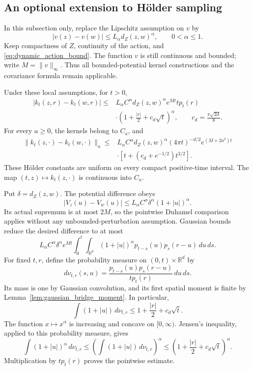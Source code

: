 \subsection{An optional extension to H\"older sampling}
In this subsection only, replace the Lipschitz assumption on $v$ by
\[
|v(z)-v(w)|\leq L_\alpha d_Z(z,w)^\alpha,
\qquad 0<\alpha\leq1.
\]
Keep compactness of $Z$, continuity of the action, and
\eqref{eq:dynamic_action_bound}. The function $v$ is still continuous
and bounded; write $M=\|v\|_\infty$. Thus all bounded-potential kernel
constructions and the covariance formula remain applicable.

\begin{theorem}
\label{thm:dynamic_kernel_holder}
Under these local assumptions, for $t>0$,
\[
\begin{split}
|k_t(z,r)-k_t(w,r)|\leq{}&
 L_\alpha C^\alpha d_Z(z,w)^\alpha e^{Mt}t p_t(r)\\
&\cdot\left(1+\frac{|r|}{2}+c_d\sqrt t\right)^\alpha,
\qquad c_d=\frac{\pi\sqrt{2d}}8.
\end{split}
\]
For every $a\geq0$, the kernels belong to $C_a$, and
\[
\begin{split}
\|k_t(z,\cdot)-k_t(w,\cdot)\|_a
\leq{}&L_\alpha C^\alpha d_Z(z,w)^\alpha
       (4\pi t)^{-d/2}e^{(M+2a^2)t}\\
&\cdot\left[t+(c_d+e^{-1/2})t^{3/2}\right].
\end{split}
\]
These H\"older constants are uniform on every compact positive-time
interval. The map $(t,z)\mapsto k_t(z,\cdot)$ is continuous into $C_a$.
\end{theorem}
\Proof
Put $\delta=d_Z(z,w)$. The potential difference obeys
\[
|V_z(u)-V_w(u)|
\leq L_\alpha C^\alpha\delta^\alpha(1+|u|)^\alpha.
\]
Its actual supremum is at most $2M$, so the pointwise Duhamel comparison
applies without any unbounded-perturbation assumption. Gaussian bounds
reduce the desired difference to at most
\[
L_\alpha C^\alpha\delta^\alpha e^{Mt}
\int_0^t\int_{\mathbb R^d}
 (1+|u|)^\alpha p_{t-s}(u)p_s(r-u)\,du\,ds.
\]
For fixed $t,r$, define the probability measure on
$(0,t)\times\mathbb R^d$ by
\[
d\nu_{t,r}(s,u)
=\frac{p_{t-s}(u)p_s(r-u)}{t p_t(r)}\,du\,ds.
\]
Its mass is one by Gaussian convolution, and its first spatial moment
is finite by Lemma~\ref{lem:gaussian_bridge_moment}. In particular,
\[
\int(1+|u|)\,d\nu_{t,r}
\leq1+\frac{|r|}{2}+c_d\sqrt t.
\]
The function $x\mapsto x^\alpha$ is increasing and concave on
$[0,\infty)$. Jensen's inequality, applied to this probability measure,
gives
\[
\int(1+|u|)^\alpha\,d\nu_{t,r}
\leq\left(\int(1+|u|)\,d\nu_{t,r}\right)^\alpha
\leq\left(1+\frac{|r|}{2}+c_d\sqrt t\right)^\alpha.
\]
Multiplication by $t p_t(r)$ proves the pointwise estimate.

